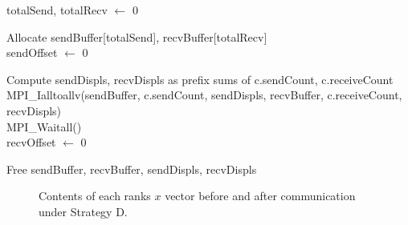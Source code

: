 \begin{algorithm}[H]
    \label{alg:reqsepexchange}
    \caption{Strategy D - Packing, exchanging and unpacking separator elements}
    \SetAlgoVlined

    totalSend, totalRecv $\gets$ 0\\

    Allocate sendBuffer[totalSend], recvBuffer[totalRecv]\\

    sendOffset $\gets$ 0\\

    Compute sendDispls, recvDispls as prefix sums of c.sendCount, c.receiveCount\\

    MPI\_Ialltoallv(sendBuffer, c.sendCount, sendDispls, recvBuffer, c.receiveCount, recvDispls)\\

    MPI\_Waitall()\\

    recvOffset $\gets$ 0\\

    Free sendBuffer, recvBuffer, sendDispls, recvDispls\\
\end{algorithm}
\medskip



\begin{figure}[H]
    \centering
    \caption{Contents of each ranks \(x\) vector before and after communication under Strategy D.}
    \label{fig:1dcomm}
\end{figure}


